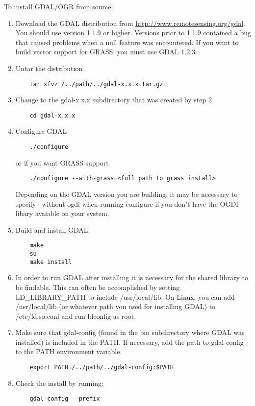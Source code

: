   To install GDAL/OGR from source:
  \begin{enumerate}
  \item Download the GDAL distribution from \url{http://www.remotesensing.org/gdal}. You should use version 1.1.9 or higher. Versions prior to 1.1.9 contained a bug that caused problems when a null feature was encountered. If you want to build vector support for GRASS, you must use GDAL 1.2.3.

  \item Untar the distribution 
  \begin{verbatim}
    tar xfvz /../path/../gdal-x.x.x.tar.gz
  \end{verbatim}

  \item Change to the gdal-x.x.x subdirectory that was created by step 2
  \begin{verbatim}
    cd gdal-x.x.x
  \end{verbatim}

  \item Configure GDAL
  \begin{verbatim}
    ./configure 
  \end{verbatim}
  or if you want GRASS support
  \begin{verbatim}
    ./configure --with-grass=<full path to grass install>
  \end{verbatim}
  Depending on the GDAL version you are building, it may be necessary to specify --without-ogdi when running configure if you don't have the OGDI libary avaiable on your system.

  \item Build and install GDAL:
  \begin{verbatim}
    make
    su
    make install
  \end{verbatim}

  \item In order to run GDAL after installing it is necessary for the shared
  library to be findable. This can often be accomplished by setting
  LD\_LIBRARY\_PATH to include /usr/local/lib. On Linux, you can add
  /usr/local/lib (or whatever path you used for installing GDAL) to
  /etc/ld.so.conf and run ldconfig as root.

  \item Make sure that gdal-config (found in the bin subdirectory where GDAL was installed) is included in the PATH. If necessary, add the path to gdal-config to the PATH environment variable.
  \begin{verbatim}
    export PATH=/../path/../gdal-config:$PATH
  \end{verbatim}

  \item Check the install by running:
  \begin{verbatim}
    gdal-config --prefix
  \end{verbatim}

  \end{enumerate}

